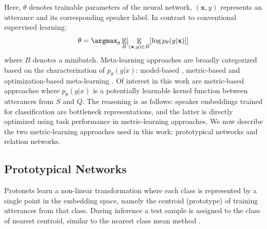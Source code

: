 Here, $\theta$ denotes trainable parameters of the neural network, $(\mathbf{x},y)$ represents an utterance and its corresponding speaker label. In contrast to conventional supervised learning:
\begin{equation}
    \theta = \argmax_{\theta} \displaystyle \mathop{\mathbb{E}}_{B} [  \mathop{\mathbb{E}}_{(\mathbf{x},y) \in B}[\log p_\theta (y|\mathbf{x})]  ]
\end{equation}
where $B$ denotes a minibatch. Meta-learning approaches are broadly categorized based on the characterization of $p_\theta (y|x)$: model-based \cite{santoro2016meta}, metric-based \cite{vinyals2016matching} and optimization-based meta-learning \cite{finn_maml2017}. 
Of interest in this work are metric-based approaches where $p_\theta (y|x)$ is a potentially learnable kernel function between utterances from $S$ and $Q$. The reasoning is as follows: speaker embeddings trained for classification are bottleneck representations, and the latter is directly optimized using task performance in metric-learning approaches. We now describe the two metric-learning approaches used in this work: prototypical networks and relation networks.

\subsection{Prototypical Networks}

Protonets learn a non-linear transformation where each class is represented by a single point in the embedding space, namely the centroid (prototype) of training utterances from that class. During inference a test sample is assigned to the class of nearest centroid, similar to the nearest class mean method \cite{mensink2013}. 

